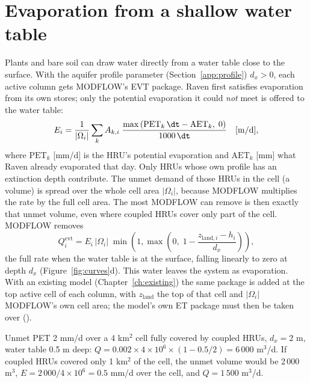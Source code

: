 \section{Evaporation from a shallow water table}\label{ch:et}
Plants and bare soil can draw water directly from a water table close to the surface. With the aquifer profile parameter  (Section~\ref{app:profile})
$d_x>0$, each active column gets MODFLOW's EVT package. Raven first satisfies evaporation from its own stores; only the
potential evaporation it could \emph{not} meet is offered to the water table:
\begin{equation}
E_i=\frac{1}{|\Omega_i|}\sum_kA_{k,i}\;\frac{\max\left(\mathrm{PET}_k\,\dt-\mathrm{AET}_k,\;0\right)}{1000\,\dt}\quad[\mathrm{m/d}],
\end{equation}
where $\mathrm{PET}_k$ [mm/d] is the HRU's potential evaporation and $\mathrm{AET}_k$ [mm] what Raven already evaporated
that day. Only HRUs whose own profile has an extinction depth contribute. The unmet demand of those HRUs in the cell (a volume) is spread over the whole cell area $|\Omega_i|$, because MODFLOW
multiplies the rate by the full cell area. The most MODFLOW can remove is then exactly that unmet volume, even where coupled
HRUs cover only part of the cell. MODFLOW removes
\begin{equation}
Q^{\mathrm{evt}}_i=E_i\,|\Omega_i|\;\min\!\left(1,\max\!\left(0,\;1-\frac{z_{\mathrm{land},i}-h_i}{d_x}\right)\right),
\end{equation}
the full rate when the water table is at the surface, falling linearly to zero at depth $d_x$ (Figure~\ref{fig:curves}d).
This water leaves the system as evaporation. With an existing model (Chapter~\ref{ch:existing}) the same package is added at the
top active cell of each column, with $z_{\mathrm{land}}$ the top of that cell and $|\Omega_i|$ MODFLOW's own cell area; the
model's own ET package must then be taken over ().
\begin{example}
Unmet PET 2 mm/d over a 4 km$^2$ cell fully covered by coupled HRUs, $d_x=2$ m, water table 0.5 m deep:
$Q=0.002\times4\times10^6\times(1-0.5/2)=6\,000$ m$^3$/d. If coupled HRUs covered only 1 km$^2$ of the cell, the unmet volume
would be 2\,000 m$^3$, $E=2\,000/4\times10^6=0.5$ mm/d over the cell, and $Q=1\,500$ m$^3$/d.
\end{example}

